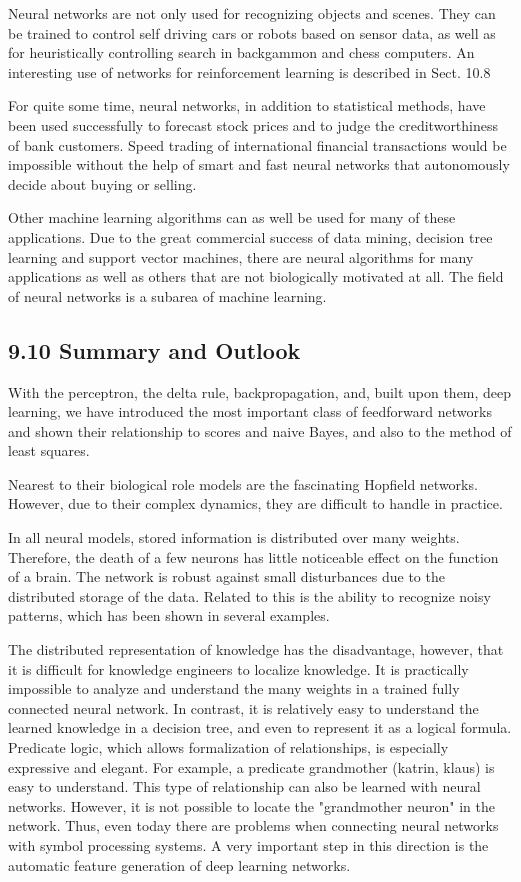 \documentclass[10pt]{article}
\begin{document}
Neural networks are not only used for recognizing objects and scenes. They can be trained to control self driving cars or robots based on sensor data, as well as for heuristically controlling search in backgammon and chess computers. An interesting use of networks for reinforcement learning is described in Sect. 10.8

For quite some time, neural networks, in addition to statistical methods, have been used successfully to forecast stock prices and to judge the creditworthiness of bank customers. Speed trading of international financial transactions would be impossible without the help of smart and fast neural networks that autonomously decide about buying or selling.

Other machine learning algorithms can as well be used for many of these applications. Due to the great commercial success of data mining, decision tree learning and support vector machines, there are neural algorithms for many applications as well as others that are not biologically motivated at all. The field of neural networks is a subarea of machine learning.

\subsection*{9.10 Summary and Outlook}
With the perceptron, the delta rule, backpropagation, and, built upon them, deep learning, we have introduced the most important class of feedforward networks and shown their relationship to scores and naive Bayes, and also to the method of least squares.

Nearest to their biological role models are the fascinating Hopfield networks. However, due to their complex dynamics, they are difficult to handle in practice.

In all neural models, stored information is distributed over many weights. Therefore, the death of a few neurons has little noticeable effect on the function of a brain. The network is robust against small disturbances due to the distributed storage of the data. Related to this is the ability to recognize noisy patterns, which has been shown in several examples.

The distributed representation of knowledge has the disadvantage, however, that it is difficult for knowledge engineers to localize knowledge. It is practically impossible to analyze and understand the many weights in a trained fully connected neural network. In contrast, it is relatively easy to understand the learned knowledge in a decision tree, and even to represent it as a logical formula. Predicate logic, which allows formalization of relationships, is especially expressive and elegant. For example, a predicate grandmother (katrin, klaus) is easy to understand. This type of relationship can also be learned with neural networks. However, it is not possible to locate the "grandmother neuron" in the network. Thus, even today there are problems when connecting neural networks with symbol processing systems. A very important step in this direction is the automatic feature generation of deep learning networks.
\end{document}
